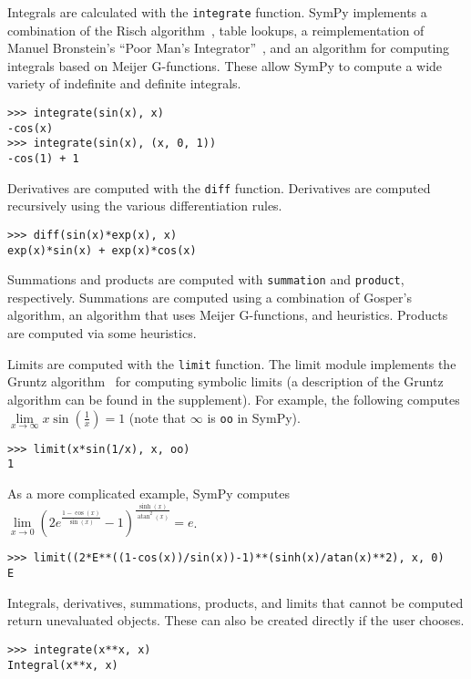 Integrals are calculated with the \verb|integrate| function. SymPy
implements a combination of the Risch
algorithm~\cite{bronstein2005integration}, table lookups, a reimplementation
of Manuel Bronstein's ``Poor Man's Integrator''~\cite{Bronstein2005pmint}, and
an algorithm for computing integrals based on Meijer G-functions. These allow
SymPy to compute a wide variety of indefinite and definite integrals.
\begin{verbatim}
>>> integrate(sin(x), x)
-cos(x)
>>> integrate(sin(x), (x, 0, 1))
-cos(1) + 1
\end{verbatim}

Derivatives are computed with the \verb|diff| function. Derivatives are
computed recursively using the various differentiation rules.
\begin{verbatim}
>>> diff(sin(x)*exp(x), x)
exp(x)*sin(x) + exp(x)*cos(x)
\end{verbatim}

Summations and products are computed with \verb|summation| and \verb|product|,
respectively. Summations are computed using a combination of Gosper's
algorithm, an algorithm that uses Meijer G-functions, and heuristics. Products
are computed via some heuristics.

Limits are computed with the \verb|limit| function. The limit module
implements the Gruntz algorithm~\cite{Gruntz1996limits} for computing symbolic
limits (a description of the Gruntz algorithm can be found in the supplement).
For example, the following computes
$\lim\limits_{x\to \infty} x\sin(\frac{1}{x})=1$ (note that $\infty$ is
\verb|oo| in SymPy).
\begin{verbatim}
>>> limit(x*sin(1/x), x, oo)
1
\end{verbatim}
As a more complicated example, SymPy computes $\lim\limits_{x\to 0}{\left(2 e^{\frac{1 - \cos{\left (x \right )}}{\sin{\left (x \right )}}} -
  1\right)}^{\frac{\sinh{\left (x \right )}}{\operatorname{atan}^{2}{\left (x
      \right )}}} = e$.
\begin{verbatim}
>>> limit((2*E**((1-cos(x))/sin(x))-1)**(sinh(x)/atan(x)**2), x, 0)
E
\end{verbatim}

Integrals, derivatives, summations, products, and limits that cannot be
computed return unevaluated objects. These can also be created directly if the
user chooses.
\begin{verbatim}
>>> integrate(x**x, x)
Integral(x**x, x)
\end{verbatim}
